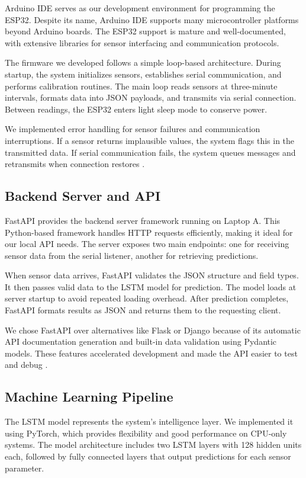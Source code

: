 Arduino IDE serves as our development environment for programming the ESP32. Despite its name, Arduino IDE supports many microcontroller platforms beyond Arduino boards. The ESP32 support is mature and well-documented, with extensive libraries for sensor interfacing and communication protocols.

The firmware we developed follows a simple loop-based architecture. During startup, the system initializes sensors, establishes serial communication, and performs calibration routines. The main loop reads sensors at three-minute intervals, formats data into JSON payloads, and transmits via serial connection. Between readings, the ESP32 enters light sleep mode to conserve power.

We implemented error handling for sensor failures and communication interruptions. If a sensor returns implausible values, the system flags this in the transmitted data. If serial communication fails, the system queues messages and retransmits when connection restores \cite{banzi2014arduino}.

\subsection{Backend Server and API}

FastAPI provides the backend server framework running on Laptop A. This Python-based framework handles HTTP requests efficiently, making it ideal for our local API needs. The server exposes two main endpoints: one for receiving sensor data from the serial listener, another for retrieving predictions.

When sensor data arrives, FastAPI validates the JSON structure and field types. It then passes valid data to the LSTM model for prediction. The model loads at server startup to avoid repeated loading overhead. After prediction completes, FastAPI formats results as JSON and returns them to the requesting client.

We chose FastAPI over alternatives like Flask or Django because of its automatic API documentation generation and built-in data validation using Pydantic models. These features accelerated development and made the API easier to test and debug \cite{ramirez2020fastapi}.

\subsection{Machine Learning Pipeline}

The LSTM model represents the system's intelligence layer. We implemented it using PyTorch, which provides flexibility and good performance on CPU-only systems. The model architecture includes two LSTM layers with 128 hidden units each, followed by fully connected layers that output predictions for each sensor parameter.

